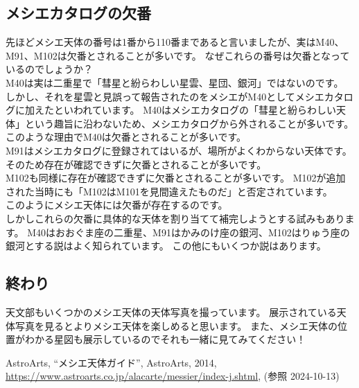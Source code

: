 \documentclass[../main]{subfiles}
\begin{document}
\subsection*{メシエカタログの欠番}
先ほどメシエ天体の番号は1番から110番まであると言いましたが、実はM40、M91、M102は欠番とされることが多いです。
なぜこれらの番号は欠番となっているのでしょうか？\\
M40は実は二重星で「彗星と紛らわしい星雲、星団、銀河」ではないのです。
しかし、それを星雲と見誤って報告されたのをメシエがM40としてメシエカタログに加えたといわれています。
M40はメシエカタログの「彗星と紛らわしい天体」という趣旨に沿わないため、メシエカタログから外されることが多いです。
このような理由でM40は欠番とされることが多いです。
\\
M91はメシエカタログに登録されてはいるが、場所がよくわからない天体です。
そのため存在が確認できずに欠番とされることが多いです。
\\
M102も同様に存在が確認できずに欠番とされることが多いです。
M102が追加された当時にも「M102はM101を見間違えたものだ」と否定されています。
\\
このようにメシエ天体には欠番が存在するのです。
\\
しかしこれらの欠番に具体的な天体を割り当てて補完しようとする試みもあります。
M40はおおぐま座の二重星、M91はかみのけ座の銀河、M102はりゅう座の銀河とする説はよく知られています。
この他にもいくつか説はあります。

\subsection*{終わり}
天文部もいくつかのメシエ天体の天体写真を撮っています。
展示されている天体写真を見るとよりメシエ天体を楽しめると思います。
また、メシエ天体の位置がわかる星図も展示しているのでそれも一緒に見てみてください！


\begin{thebibliography}{9}
   AstroArts, ``メシエ天体ガイド'', AstroArts, 2014, \url{https://www.astroarts.co.jp/alacarte/messier/index-j.shtml}, (参照 2024-10-13)
\end{thebibliography}
\end{document}
